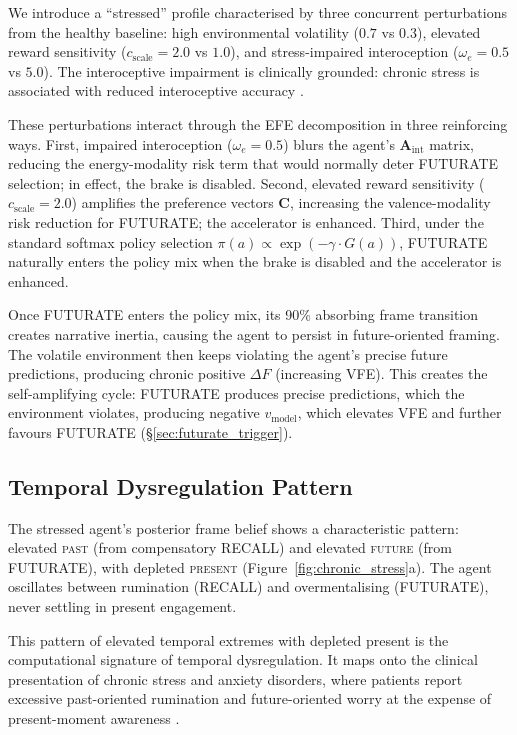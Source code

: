 \documentclass[11pt,a4paper]{article}
\begin{document}
We introduce a ``stressed'' profile characterised by three concurrent perturbations from the healthy baseline: high environmental volatility ($0.7$ vs $0.3$), elevated reward sensitivity ($c_{\text{scale}} = 2.0$ vs $1.0$), and stress-impaired interoception ($\omega_e = 0.5$ vs $5.0$). The interoceptive impairment is clinically grounded: chronic stress is associated with reduced interoceptive accuracy \citep{barrett2017theory, seth2016interoceptive}.

These perturbations interact through the EFE decomposition in three reinforcing ways. First, impaired interoception ($\omega_e = 0.5$) blurs the agent's $\mathbf{A}_{\text{int}}$ matrix, reducing the energy-modality risk term that would normally deter FUTURATE selection; in effect, the brake is disabled. Second, elevated reward sensitivity ($c_{\text{scale}} = 2.0$) amplifies the preference vectors $\mathbf{C}$, increasing the valence-modality risk reduction for FUTURATE; the accelerator is enhanced. Third, under the standard softmax policy selection $\pi(a) \propto \exp(-\gamma \cdot G(a))$, FUTURATE naturally enters the policy mix when the brake is disabled and the accelerator is enhanced.

Once FUTURATE enters the policy mix, its 90\% absorbing frame transition creates narrative inertia, causing the agent to persist in future-oriented framing. The volatile environment then keeps violating the agent's precise future predictions, producing chronic positive $\Delta F$ (increasing VFE). This creates the self-amplifying cycle: FUTURATE produces precise predictions, which the environment violates, producing negative $v_{\text{model}}$, which elevates VFE and further favours FUTURATE (\S\ref{sec:futurate_trigger}).

\subsection{Temporal Dysregulation Pattern}\label{sec:temporal_dysreg}

The stressed agent's posterior frame belief shows a characteristic pattern: elevated \textsc{past} (from compensatory RECALL) and elevated \textsc{future} (from FUTURATE), with depleted \textsc{present} (Figure~\ref{fig:chronic_stress}a). The agent oscillates between rumination (RECALL) and overmentalising (FUTURATE), never settling in present engagement.

This pattern of elevated temporal extremes with depleted present is the computational signature of temporal dysregulation. It maps onto the clinical presentation of chronic stress and anxiety disorders, where patients report excessive past-oriented rumination and future-oriented worry at the expense of present-moment awareness \citep{berg2022rumination}.
\end{document}
